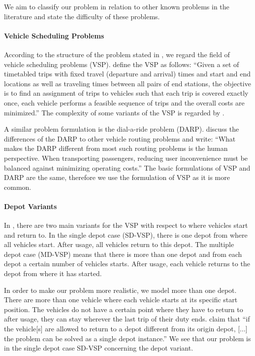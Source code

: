 We aim to classify our problem in relation to other known problems in the literature and state the difficulty of these problems.

\paragraph{Vehicle Scheduling Problems} \parfill

According to the structure of the problem stated in , we regard the field of vehicle scheduling problems (VSP). \cite{Bunte_Kliewer} define the VSP as follows: \enquote{Given a set of timetabled trips with fixed travel (departure and arrival) times and start and end locations as well as traveling times between all pairs of end stations, the objective is to find an assignment of trips to vehicles such that each trip is covered exactly once, each vehicle performs a feasible sequence of trips and the overall costs are minimized.} The complexity of some variants of the VSP is regarded by \cite{Lenstra_Kan}.

A similar problem formulation is the dial-a-ride problem (DARP). \cite{Cordeau_Laporte} discuss the differences of the DARP to other vehicle routing problems and write: \enquote{What makes the DARP different from most such routing problems is the human perspective. When transporting passengers, reducing user inconvenience must be balanced against minimizing operating costs.} The basic formulations of VSP and DARP are the same, therefore we use the formulation of VSP as it is more common.

\paragraph{Depot Variants} \parfill 

In \cite{Bunte_Kliewer}, there are two main variants for the VSP with respect to where vehicles start and return to. In the single depot case (SD-VSP), there is one depot from where all vehicles start. After usage, all vehicles return to this depot. The multiple depot case (MD-VSP) means that there is more than one depot and from each depot a certain number of vehicles starts. After usage, each vehicle returns to the depot from where it has started. 

In order to make our problem more realistic, we model more than one depot. There are more than one vehicle where each vehicle starts at its specific start position. The vehicles do not have a certain point where they have to return to after usage, \ie they can stay wherever the last trip of their duty ends. \cite{Daduna_Paixao} claim that \enquote{if the vehicle[s] are allowed to return to a depot different from its origin depot, [...] the problem can be solved as a single depot instance.} We see that our problem is in the single depot case SD-VSP concerning the depot variant.

